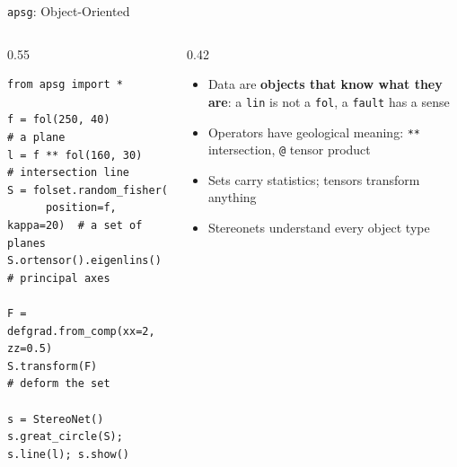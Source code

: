 \documentclass[aspectratio=169,11pt]{beamer}
\begin{document}
\begin{frame}[fragile]{\texttt{apsg}: Object-Oriented}
  \begin{columns}[T]
    \begin{column}{0.55\textwidth}
      \begin{lstlisting}[style=python]
from apsg import *

f = fol(250, 40)           # a plane
l = f ** fol(160, 30)      # intersection line
S = folset.random_fisher(
      position=f, kappa=20)  # a set of planes
S.ortensor().eigenlins()   # principal axes

F = defgrad.from_comp(xx=2, zz=0.5)
S.transform(F)             # deform the set

s = StereoNet()
s.great_circle(S); s.line(l); s.show()
      \end{lstlisting}
    \end{column}
    \begin{column}{0.42\textwidth}
      \small
      \begin{itemize}
        \item Data are \textbf{objects that know what they are}: a
              \texttt{lin} is not a \texttt{fol}, a \texttt{fault} has a sense
        \item Operators have geological meaning: \texttt{**} intersection,
              \texttt{@} tensor product
        \item Sets carry statistics; tensors transform anything
        \item Stereonets understand every object type
      \end{itemize}
    \end{column}
  \end{columns}
\end{frame}
\end{document}
